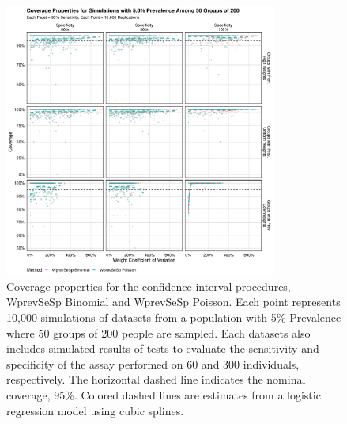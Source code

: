 \documentclass[AMA,STIX1COL]{WileyNJD-v2}
\begin{document}
\begin{figure}
\centering
\includegraphics[width=0.8\textwidth]{figures/imperfect_coverage_50_groups_0_05_prev.pdf}
\caption{Coverage properties for the confidence interval procedures, WprevSeSp Binomial and WprevSeSp Poisson.
Each point represents 10,000 simulations of datasets from a population with 5\% Prevalence where 50 groups of 200 people are sampled.
Each datasets also includes simulated results of tests to evaluate the sensitivity and specificity of the assay performed on 60 and 300 individuals, respectively.
The horizontal dashed line indicates the nominal coverage, 95\%.
Colored dashed lines are estimates from a logistic regression model using cubic splines.}
\label{fig:imperfect_coverage_50_groups_0_05_prev}
\end{figure}
\end{document}
